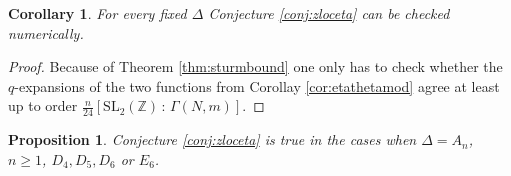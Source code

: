 \documentclass[11pt,a4paper]{amsart}
\newtheorem{proposition}[theorem]{Proposition}
\newtheorem{corollary}[theorem]{Corollary}
\theoremstyle{definition}
\newcommand{\SZ}{\mathbb{Z}}                    %
\begin{document}
\begin{corollary}
For every fixed $\Delta$ Conjecture \ref{conj:zloceta} can be checked numerically.
\end{corollary}
\begin{proof}
Because of Theorem \ref{thm:sturmbound}
one only has to check whether the $q$-expansions of the two functions from Corollay \ref{cor:etathetamod} agree at least up to order $\frac{n}{24} [\mathrm{SL}_2(\SZ) \, : \, \Gamma(N,m) ]$.
\end{proof}


\begin{proposition}
\label{prop:zlocetacheck}
Conjecture \ref{conj:zloceta} is true in the cases when $\Delta=A_n$, $n\geq 1$, $D_4, D_5, D_6$ or $E_6$.
 \end{proposition}
\end{document}
